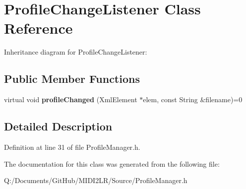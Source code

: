 \hypertarget{class_profile_change_listener}{}\section{Profile\+Change\+Listener Class Reference}
\label{class_profile_change_listener}


Inheritance diagram for Profile\+Change\+Listener\+:
\subsection*{Public Member Functions}
\begin{DoxyCompactItemize}
\item 
virtual void {\bfseries profile\+Changed} (Xml\+Element $\ast$elem, const String \&filename)=0\hypertarget{class_profile_change_listener_a73fd7f608cfd6f31ac1dc8d7d1da5756}{}\label{class_profile_change_listener_a73fd7f608cfd6f31ac1dc8d7d1da5756}

\end{DoxyCompactItemize}


\subsection{Detailed Description}


Definition at line 31 of file Profile\+Manager.\+h.



The documentation for this class was generated from the following file\+:\begin{DoxyCompactItemize}
\item 
Q\+:/\+Documents/\+Git\+Hub/\+M\+I\+D\+I2\+L\+R/\+Source/Profile\+Manager.\+h\end{DoxyCompactItemize}
